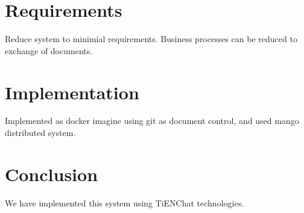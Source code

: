 \documentclass[journal]{IEEEtran}
\begin{document}
\section{Requirements}

Reduce system to minimial requirements.  Business processes can be
reduced to exchange of documents.

\section{Implementation}

Implemented as docker imagine using git as document control, and used
mango distributed system.

\section{Conclusion}
We have implemented this system using TiENChat technologies.
\end{document}
